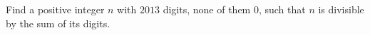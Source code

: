 Find a positive integer $n$ with $2013$ digits, none of them $0$, such that $n$ is divisible by the sum of its digits.
